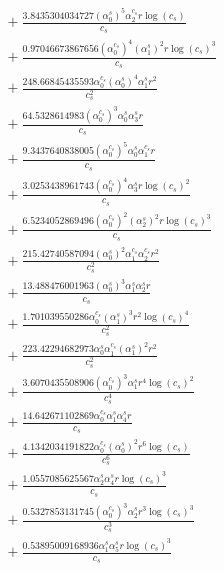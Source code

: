 \documentclass[10pt]{article}
\begin{document}
\begin{align*}
&{}  + \frac{3.8435304034727 \left(\alpha_{0}^s\right)^{5} \alpha_{2}^{c_s} r \log{\left(c_{s} \right)}}{c_{s}} \\
&{}  + \frac{0.97046673867656 \left(\alpha_{0}^{c_s}\right)^{4} \left(\alpha_{1}^s\right)^{2} r \log{\left(c_{s} \right)}^{3}}{c_{s}} \\
&{}  + \frac{248.66845435593 \alpha_{0}^{c_s} \left(\alpha_{0}^s\right)^{4} \alpha_{1}^s r^{2}}{c_{s}^{2}} \\
&{}  + \frac{64.5328614983 \left(\alpha_{0}^{c_s}\right)^{3} \alpha_{0}^s \alpha_{3}^s r}{c_{s}} \\
&{}  + \frac{9.3437640838005 \left(\alpha_{0}^{c_s}\right)^{5} \alpha_{0}^s \alpha_{1}^{c_s} r}{c_{s}} \\
&{}  + \frac{3.0253438961743 \left(\alpha_{0}^{c_s}\right)^{4} \alpha_{3}^s r \log{\left(c_{s} \right)}^{2}}{c_{s}} \\
&{}  + \frac{6.5234052869496 \left(\alpha_{0}^{c_s}\right)^{2} \left(\alpha_{2}^s\right)^{2} r \log{\left(c_{s} \right)}^{3}}{c_{s}} \\
&{}  + \frac{215.42740587094 \left(\alpha_{0}^s\right)^{2} \alpha_{1}^{c_s} \alpha_{2}^{c_s} r^{2}}{c_{s}^{2}} \\
&{}  + \frac{13.488476001963 \left(\alpha_{0}^s\right)^{3} \alpha_{1}^s \alpha_{2}^s r}{c_{s}} \\
&{}  + \frac{1.701039550286 \alpha_{0}^{c_s} \left(\alpha_{1}^s\right)^{3} r^{2} \log{\left(c_{s} \right)}^{4}}{c_{s}^{2}} \\
&{}  + \frac{223.42294682973 \alpha_{0}^s \alpha_{1}^{c_s} \left(\alpha_{1}^s\right)^{2} r^{2}}{c_{s}^{2}} \\
&{}  + \frac{3.6070435508906 \left(\alpha_{0}^{c_s}\right)^{3} \alpha_{1}^s r^{4} \log{\left(c_{s} \right)}^{2}}{c_{s}^{4}} \\
&{}  + \frac{14.642671102869 \alpha_{0}^{c_s} \alpha_{1}^s \alpha_{4}^s r}{c_{s}} \\
&{}  + \frac{4.1342034191822 \alpha_{0}^{c_s} \left(\alpha_{0}^s\right)^{2} r^{6} \log{\left(c_{s} \right)}}{c_{s}^{6}} \\
&{}  + \frac{1.0557085625567 \alpha_{2}^s \alpha_{4}^s r \log{\left(c_{s} \right)}^{3}}{c_{s}} \\
&{}  + \frac{0.5327853131745 \left(\alpha_{0}^{c_s}\right)^{3} \alpha_{2}^s r^{3} \log{\left(c_{s} \right)}^{3}}{c_{s}^{3}} \\
&{}  + \frac{0.53895009168936 \alpha_{1}^s \alpha_{5}^s r \log{\left(c_{s} \right)}^{3}}{c_{s}} \\

\end{align*}
\end{document}
